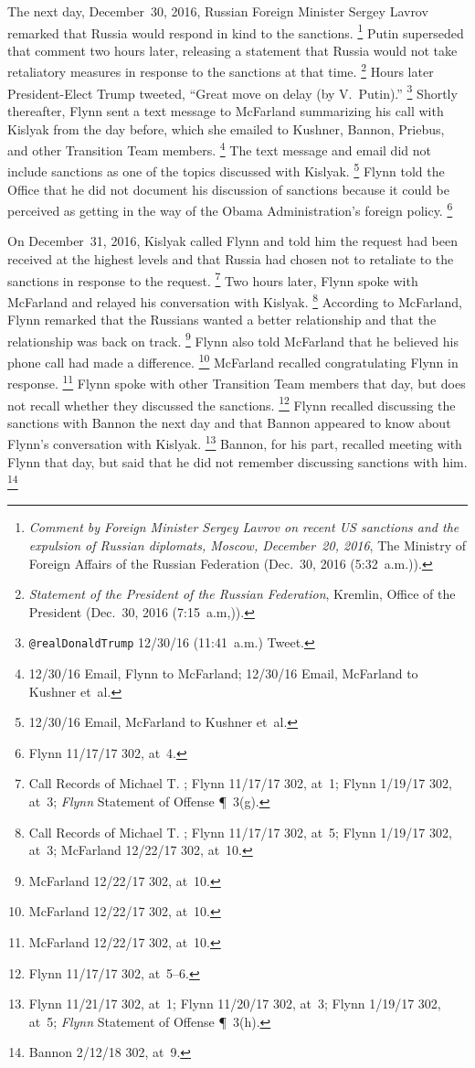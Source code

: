 The next day, December~30, 2016, Russian Foreign Minister Sergey Lavrov remarked that Russia would respond in kind to the sanctions.%
\footnote{\textit{Comment by Foreign Minister Sergey Lavrov on recent US sanctions and the expulsion of Russian diplomats, Moscow, December~20, 2016}, The Ministry of Foreign Affairs of the Russian Federation (Dec.~30, 2016 (5:32~a.m.)).}
Putin superseded that comment two hours later, releasing a statement that Russia would not take retaliatory measures in response to the sanctions at that time.%
\footnote{\textit{Statement of the President of the Russian Federation}, Kremlin, Office of the President (Dec.~30, 2016 (7:15~a.m,)).}
Hours later President-Elect Trump tweeted, ``Great move on delay (by V.~Putin).''%
\footnote{\verb+@realDonaldTrump+ 12/30/16 (11:41~a.m.) Tweet.}
Shortly thereafter, Flynn sent a text message to McFarland summarizing his call with Kislyak from the day before, which she emailed to Kushner, Bannon, Priebus, and other Transition Team members.%
\footnote{12/30/16 Email, Flynn to McFarland;
12/30/16 Email, McFarland to Kushner et~al.}
The text message and email did not include sanctions as one of the topics discussed with Kislyak.%
\footnote{12/30/16 Email, McFarland to Kushner et~al.}
Flynn told the Office that he did not document his discussion of sanctions because it could be perceived as getting in the way of the Obama Administration's foreign policy.%
\footnote{Flynn 11/17/17 302, at~4.}

On December~31, 2016, Kislyak called Flynn and told him the request had been received at the highest levels and that Russia had chosen not to retaliate to the sanctions in response to the request.%
\footnote{Call Records of Michael T. ;
Flynn 11/17/17 302, at~1;
Flynn 1/19/17 302, at~3;
\textit{Flynn} Statement of Offense \P~3(g).}
Two hours later, Flynn spoke with McFarland and relayed his conversation with Kislyak.%
\footnote{Call Records of Michael T. ;
Flynn 11/17/17 302, at~5;
Flynn 1/19/17 302, at~3;
McFarland 12/22/17 302, at~10.}
According to McFarland, Flynn remarked that the Russians wanted a better relationship and that the relationship was back on track.%
\footnote{McFarland 12/22/17 302, at~10.}
Flynn also told McFarland that he believed his phone call had made a difference.%
\footnote{McFarland 12/22/17 302, at~10.}
McFarland recalled congratulating Flynn in response.%
\footnote{McFarland 12/22/17 302, at~10.}
Flynn spoke with other Transition Team members that day, but does not recall whether they discussed the sanctions.%
\footnote{Flynn 11/17/17 302, at~5--6.}
Flynn recalled discussing the sanctions with Bannon the next day and that Bannon appeared to know about Flynn's conversation with Kislyak.%
\footnote{Flynn 11/21/17 302, at~1;
Flynn 11/20/17 302, at~3;
Flynn 1/19/17 302, at~5;
\textit{Flynn} Statement of Offense \P~3(h).}
Bannon, for his part, recalled meeting with Flynn that day, but said that he did not remember discussing sanctions with him.%
\footnote{Bannon 2/12/18 302, at~9.}

